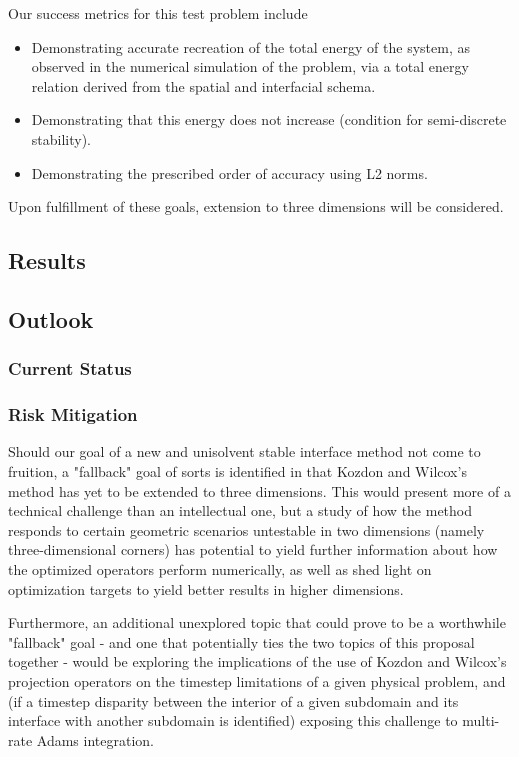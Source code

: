 Our success metrics for this test problem include
\begin{itemize}
\item{Demonstrating accurate recreation of the total energy of the system, as observed in the numerical simulation of the problem, via a total energy relation derived from the
spatial and interfacial schema.}
\item{Demonstrating that this energy does not increase (condition for semi-discrete stability).}
\item{Demonstrating the prescribed order of accuracy using L2 norms.}
\end{itemize}

Upon fulfillment of these goals, extension to three dimensions will be considered.

\subsection{Results}

\subsection{Outlook}

\subsubsection{Current Status}

\subsubsection{Risk Mitigation}

Should our goal of a new and unisolvent stable interface method not come to
fruition, a "fallback" goal of sorts is identified in that Kozdon and Wilcox's
method has yet to be extended to three dimensions. This would present more of a
technical challenge than an intellectual one, but a study of how the method
responds to certain geometric scenarios untestable in two dimensions (namely
three-dimensional corners) has potential to yield further information about
how the optimized operators perform numerically, as well as shed light on
optimization targets to yield better results in higher dimensions.

Furthermore, an additional unexplored topic that could prove to be a worthwhile
"fallback" goal - and one that potentially ties the two topics of this proposal
together - would be exploring the implications of the use of Kozdon and Wilcox's
projection operators on the timestep limitations of a given physical problem, and
(if a timestep disparity between the interior of a given subdomain and its interface
with another subdomain is identified) exposing this challenge to multi-rate Adams
integration.




